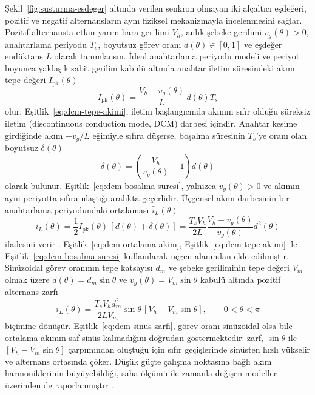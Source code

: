 Şekil~\ref{fig:susturma-esdeger} altında verilen senkron olmayan iki alçaltıcı eşdeğeri, pozitif ve negatif alternansların aynı fiziksel mekanizmayla incelenmesini sağlar. Pozitif alternansta etkin yarım bara gerilimi $V_h$, anlık şebeke gerilimi $v_g(\theta)>0$, anahtarlama periyodu $T_s$, boyutsuz görev oranı $d(\theta)\in[0,1]$ ve eşdeğer endüktans $L$ olarak tanımlansın. İdeal anahtarlama periyodu modeli ve periyot boyunca yaklaşık sabit gerilim kabulü altında anahtar iletim süresindeki akım tepe değeri $I_{\mathrm{pk}}(\theta)$
\begin{equation}
  I_{\mathrm{pk}}(\theta)=\frac{V_h-v_g(\theta)}{L}\,d(\theta)T_s
  \label{eq:dcm-tepe-akimi}
\end{equation}
olur. Eşitlik~\eqref{eq:dcm-tepe-akimi}, iletim başlangıcında akımın sıfır olduğu süreksiz iletim (discontinuous conduction mode, DCM) darbesi içindir. Anahtar kesime girdiğinde akım $-v_g/L$ eğimiyle sıfıra düşerse, boşalma süresinin $T_s$'ye oranı olan boyutsuz $\delta(\theta)$
\begin{equation}
  \delta(\theta)=\left(\frac{V_h}{v_g(\theta)}-1\right)d(\theta)
  \label{eq:dcm-bosalma-suresi}
\end{equation}
olarak bulunur. Eşitlik~\eqref{eq:dcm-bosalma-suresi}, yalnızca $v_g(\theta)>0$ ve akımın aynı periyotta sıfıra ulaştığı aralıkta geçerlidir. Üçgensel akım darbesinin bir anahtarlama periyodundaki ortalaması $\bar i_L(\theta)$
\begin{equation}
  \bar i_L(\theta)=\frac{1}{2}I_{\mathrm{pk}}(\theta)\,[d(\theta)+\delta(\theta)]
  =\frac{T_sV_h}{2L}\frac{V_h-v_g(\theta)}{v_g(\theta)}d^2(\theta)
  \label{eq:dcm-ortalama-akim}
\end{equation}
ifadesini verir \citep{Erickson2001,Chen2010}. Eşitlik~\eqref{eq:dcm-ortalama-akim}, Eşitlik~\eqref{eq:dcm-tepe-akimi} ile Eşitlik~\eqref{eq:dcm-bosalma-suresi} kullanılarak üçgen alanından elde edilmiştir. Sinüzoidal görev oranının tepe katsayısı $d_m$ ve şebeke geriliminin tepe değeri $V_m$ olmak üzere $d(\theta)=d_m\sin\theta$ ve $v_g(\theta)=V_m\sin\theta$ kabulü altında pozitif alternans zarfı
\begin{equation}
  \bar i_L(\theta)=\frac{T_sV_hd_m^2}{2LV_m}\sin\theta\,[V_h-V_m\sin\theta],
  \qquad 0<\theta<\pi
  \label{eq:dcm-sinus-zarfi}
\end{equation}
biçimine dönüşür. Eşitlik~\eqref{eq:dcm-sinus-zarfi}, görev oranı sinüzoidal olsa bile ortalama akımın saf sinüs kalmadığını doğrudan göstermektedir: zarf, $\sin\theta$ ile $[V_h-V_m\sin\theta]$ çarpımından oluştuğu için sıfır geçişlerinde sinüsten hızlı yükselir ve alternans ortasında çöker. Düşük güçte çalışma noktasına bağlı akım harmoniklerinin büyüyebildiği, saha ölçümü ile zamanla değişen modeller üzerinden de raporlanmıştır \citep{Chicco2009,Du2013}.


